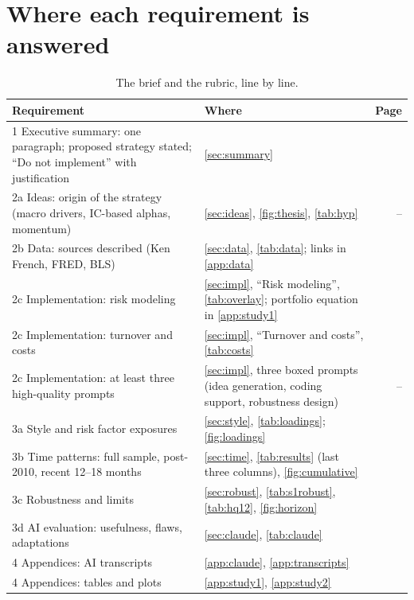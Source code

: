 \clearpage
\section{Where each requirement is answered}\label{app:rubric}
\begin{table}[H]
\centering\footnotesize
\caption{The brief and the rubric, line by line.}
\begin{tabularx}{\textwidth}{@{}p{6.3cm} X r@{}}
\toprule
Requirement & Where & Page \\
\midrule
1 Executive summary: one paragraph; proposed strategy stated; ``Do not implement'' with justification & \cref{sec:summary} & \pageref{sec:summary} \\
2a Ideas: origin of the strategy (macro drivers, IC-based alphas, momentum) & \cref{sec:ideas}, \cref{fig:thesis}, \cref{tab:hyp} & \pageref{sec:ideas}--\pageref{tab:hyp} \\
2b Data: sources described (Ken French, FRED, BLS) & \cref{sec:data}, \cref{tab:data}; links in \cref{app:data} & \pageref{sec:data} \\
2c Implementation: risk modeling & \cref{sec:impl}, ``Risk modeling'', \cref{tab:overlay}; portfolio equation in \cref{app:study1} & \pageref{par:risk} \\
2c Implementation: turnover and costs & \cref{sec:impl}, ``Turnover and costs'', \cref{tab:costs} & \pageref{par:costs} \\
2c Implementation: at least three high-quality prompts & \cref{sec:impl}, three boxed prompts (idea generation, coding support, robustness design) & \pageref{sec:ai}--\pageref{box:p4} \\
3a Style and risk factor exposures & \cref{sec:style}, \cref{tab:loadings}; \cref{fig:loadings} & \pageref{sec:style} \\
3b Time patterns: full sample, post-2010, recent 12--18 months & \cref{sec:time}, \cref{tab:results} (last three columns), \cref{fig:cumulative} & \pageref{sec:time} \\
3c Robustness and limits & \cref{sec:robust}, \cref{tab:s1robust}, \cref{tab:hq12}, \cref{fig:horizon} & \pageref{sec:robust} \\
3d AI evaluation: usefulness, flaws, adaptations & \cref{sec:claude}, \cref{tab:claude} & \pageref{sec:claude} \\
4 Appendices: AI transcripts & \cref{app:claude}, \cref{app:transcripts} & \pageref{app:claude} \\
4 Appendices: tables and plots & \cref{app:study1}, \cref{app:study2} & \pageref{app:study1} \\

\end{tabularx}
\end{table}
